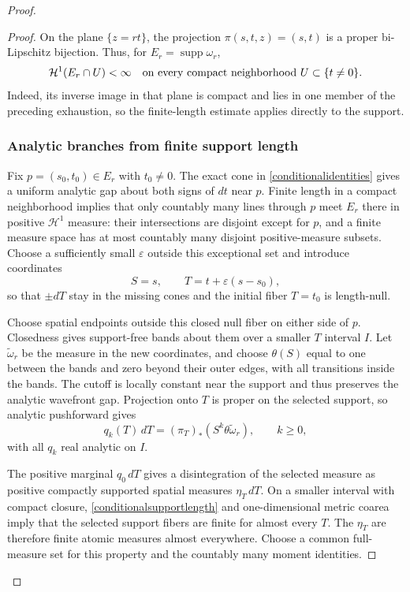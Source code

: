 \documentclass[11pt]{article}
\newcommand{\HH}{\mathcal H}
\newcommand{\supp}{\operatorname{supp}}
\begin{document}
\begin{proof}
\begin{proof}
On the plane $\{z=rt\}$, the projection $\pi(s,t,z)=(s,t)$ is a proper bi-Lipschitz bijection. Thus, for $E_r=\supp\omega_r$,
\begin{equation}\label{conditionalsupportlength}
 \HH^1(E_r\cap U)<\infty
 \quad\hbox{on every compact neighborhood }U\subset\{t\ne0\}.
\end{equation}
Indeed, its inverse image in that plane is compact and lies in one member of the preceding exhaustion, so the finite-length estimate applies directly to the support.

\subsubsection{Analytic branches from finite support length}
Fix $p=(s_0,t_0)\in E_r$ with $t_0\ne0$. The exact cone in \eqref{conditionalidentities} gives a uniform analytic gap about both signs of $dt$ near $p$. Finite length in a compact neighborhood implies that only countably many lines through $p$ meet $E_r$ there in positive $\HH^1$ measure: their intersections are disjoint except for $p$, and a finite measure space has at most countably many disjoint positive-measure subsets. Choose a sufficiently small $\varepsilon$ outside this exceptional set and introduce coordinates
\[
 S=s,\qquad T=t+\varepsilon(s-s_0),
\]
so that $\pm dT$ stay in the missing cones and the initial fiber $T=t_0$ is length-null.

Choose spatial endpoints outside this closed null fiber on either side of $p$. Closedness gives support-free bands about them over a smaller $T$ interval $I$. Let $\widetilde\omega_r$ be the measure in the new coordinates, and choose $\theta(S)$ equal to one between the bands and zero beyond their outer edges, with all transitions inside the bands. The cutoff is locally constant near the support and thus preserves the analytic wavefront gap. Projection onto $T$ is proper on the selected support, so analytic pushforward gives
\begin{equation}\label{analyticatomicmoments}
 q_k(T)\,dT=(\pi_T)_*(S^k\theta\widetilde\omega_r),\qquad k\ge0,
\end{equation}
with all $q_k$ real analytic on $I$.

The positive marginal $q_0\,dT$ gives a disintegration of the selected measure as positive compactly supported spatial measures $\eta_T\,dT$. On a smaller interval with compact closure, \eqref{conditionalsupportlength} and one-dimensional metric coarea \cite[Theorem 1.1]{EH} imply that the selected support fibers are finite for almost every $T$. The $\eta_T$ are therefore finite atomic measures almost everywhere. Choose a common full-measure set for this property and the countably many moment identities.


\end{proof}
\end{proof}
\end{document}
